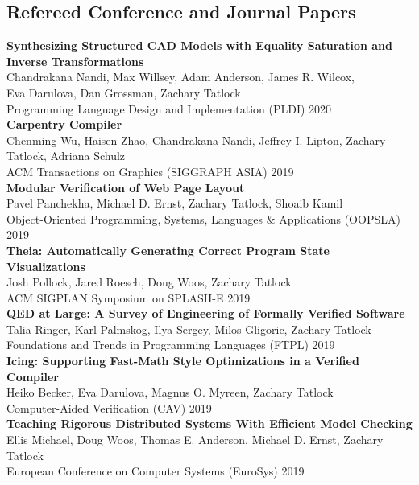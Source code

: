 \documentclass[10pt]{article}
\begin{document}
\subsection*{Refereed Conference and Journal Papers}

\textbf{%
Synthesizing Structured CAD Models with
Equality Saturation and Inverse Transformations
} \\
Chandrakana Nandi, Max Willsey, Adam Anderson, James R. Wilcox, \\
Eva Darulova, Dan Grossman, Zachary Tatlock \\
Programming Language Design and Implementation (PLDI) 2020 \\

\textbf{%
Carpentry Compiler
} \\
Chenming Wu, Haisen Zhao, Chandrakana Nandi, Jeffrey I. Lipton, Zachary Tatlock, Adriana Schulz \\
ACM Transactions on Graphics (SIGGRAPH ASIA) 2019 \\

\textbf{%
Modular Verification of Web Page Layout
} \\
Pavel Panchekha, Michael D. Ernst, Zachary Tatlock, Shoaib Kamil \\
Object-Oriented Programming, Systems, Languages \& Applications (OOPSLA) 2019 \\

\textbf{%
Theia: Automatically Generating Correct Program State Visualizations
} \\
Josh Pollock, Jared Roesch, Doug Woos, Zachary Tatlock \\
ACM SIGPLAN Symposium on SPLASH-E 2019 \\

\textbf{%
QED at Large: A Survey of Engineering of Formally Verified Software
} \\
Talia Ringer, Karl Palmskog, Ilya Sergey, Milos Gligoric, Zachary Tatlock \\
Foundations and Trends in Programming Languages (FTPL) 2019 \\

\textbf{%
Icing: Supporting Fast-Math Style Optimizations in a Verified Compiler
} \\
Heiko Becker, Eva Darulova, Magnus O. Myreen, Zachary Tatlock \\
Computer-Aided Verification (CAV) 2019 \\

\textbf{%
Teaching Rigorous Distributed Systems With Efficient Model Checking
} \\
Ellis Michael, Doug Woos, Thomas E. Anderson, Michael D. Ernst, Zachary Tatlock \\
European Conference on Computer Systems (EuroSys) 2019 \\
\end{document}
